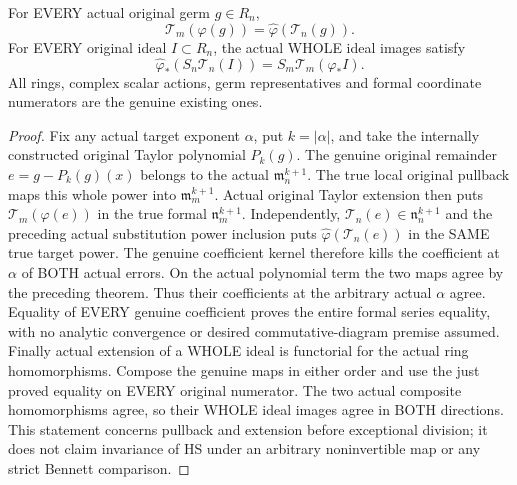 \begin{theorem}
\label{hir:actual-original-formal-taylor-entire-pullback-naturality}
For EVERY actual original germ $g\in R_n$,
\[
 \mathcal T_m(\varphi(g))=\widehat\varphi(\mathcal T_n(g)).
\]
For EVERY original ideal $I\subset R_n$, the actual WHOLE ideal images
satisfy
\[
 \widehat\varphi_*(S_n\mathcal T_n(I))
 =S_m\mathcal T_m(\varphi_*I).
\]
All rings, complex scalar actions, germ representatives and formal
coordinate numerators are the genuine existing ones.
\leanok
\end{theorem}
\begin{proof}
Fix any actual target exponent $\alpha$, put $k=|\alpha|$, and take
the internally constructed original Taylor polynomial $P_k(g)$.
The genuine original remainder $e=g-P_k(g)(x)$ belongs to the actual
$\mathfrak m_n^{k+1}$. The true local original pullback maps this
whole power into $\mathfrak m_m^{k+1}$. Actual original Taylor
extension then puts $\mathcal T_m(\varphi(e))$ in the true formal
$\mathfrak n_m^{k+1}$. Independently,
$\mathcal T_n(e)\in\mathfrak n_n^{k+1}$ and the preceding actual
substitution power inclusion puts
$\widehat\varphi(\mathcal T_n(e))$ in the SAME true target power.
The genuine coefficient kernel therefore kills the coefficient at
$\alpha$ of BOTH actual errors. On the actual polynomial term the two
maps agree by the preceding theorem. Thus their coefficients at the
arbitrary actual $\alpha$ agree. Equality of EVERY genuine coefficient
proves the entire formal series equality, with no analytic convergence
or desired commutative-diagram premise assumed.
Finally actual extension of a WHOLE ideal is functorial for the actual
ring homomorphisms. Compose the genuine maps in either order and use
the just proved equality on EVERY original numerator. The two actual
composite homomorphisms agree, so their WHOLE ideal images agree in
BOTH directions. This statement concerns pullback and extension before
exceptional division; it does not claim invariance of HS under an
arbitrary noninvertible map or any strict Bennett comparison.
\end{proof}
